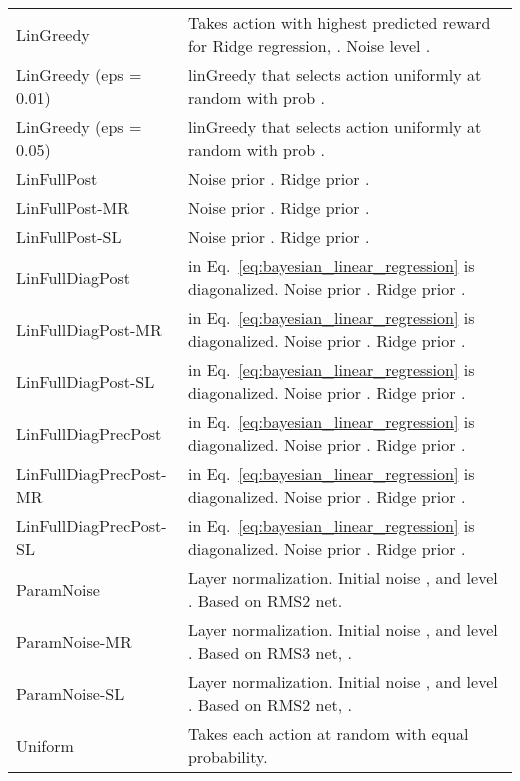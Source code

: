 \documentclass{article} \usepackage{iclr2018_conference,times}
\begin{document}
\begin{table}[ht]
\begin{adjustbox}{center}
\begin{tabular}{ll}
LinGreedy & Takes action with highest predicted reward for Ridge regression, . Noise level . \\
LinGreedy (eps = 0.01) & linGreedy that selects action uniformly at random with prob . \\
LinGreedy (eps = 0.05) & linGreedy that selects action uniformly at random with prob . \\
LinFullPost & Noise prior . Ridge prior . \\
LinFullPost-MR & Noise prior . Ridge prior . \\
LinFullPost-SL & Noise prior . Ridge prior . \\
LinFullDiagPost &  in Eq.~\ref{eq:bayesian_linear_regression} is diagonalized. Noise prior . Ridge prior . \\
LinFullDiagPost-MR &  in Eq.~\ref{eq:bayesian_linear_regression} is diagonalized. Noise prior . Ridge prior . \\
LinFullDiagPost-SL &  in Eq.~\ref{eq:bayesian_linear_regression} is diagonalized. Noise prior . Ridge prior . \\
LinFullDiagPrecPost &  in Eq.~\ref{eq:bayesian_linear_regression} is diagonalized. Noise prior . Ridge prior . \\
LinFullDiagPrecPost-MR &  in Eq.~\ref{eq:bayesian_linear_regression} is diagonalized. Noise prior . Ridge prior . \\
LinFullDiagPrecPost-SL &  in Eq.~\ref{eq:bayesian_linear_regression} is diagonalized. Noise prior . Ridge prior . \\
ParamNoise & Layer normalization. Initial noise , and level . Based on RMS2 net.  \\
ParamNoise-MR & Layer normalization. Initial noise , and level . Based on RMS3 net, .  \\
ParamNoise-SL & Layer normalization. Initial noise , and level . Based on RMS2 net, . \\
Uniform & Takes each action at random with equal probability. \\
    \bottomrule
  \end{tabular}
\end{adjustbox}
\end{table}
\end{document}
